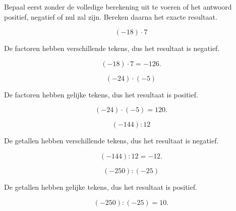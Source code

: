 \documentclass{ximera}
\begin{document}
\begin{oefening}{\oefU}

Bepaal eerst zonder de volledige berekening uit te voeren of het antwoord
positief, negatief of nul zal zijn. Bereken daarna het exacte resultaat.

\begin{question}

\[
(-18)\cdot7
\]

\begin{oplossing}

De factoren hebben verschillende tekens, dus het resultaat is negatief.

\[
(-18)\cdot7=-126.
\]

\end{oplossing}

\end{question}


\begin{question}

\[
(-24)\cdot(-5)
\]

\begin{oplossing}

De factoren hebben gelijke tekens, dus het resultaat is positief.

\[
(-24)\cdot(-5)=120.
\]

\end{oplossing}

\end{question}


\begin{question}

\[
(-144):12
\]

\begin{oplossing}

De getallen hebben verschillende tekens, dus het resultaat is negatief.

\[
(-144):12=-12.
\]

\end{oplossing}

\end{question}


\begin{question}

\[
(-250):(-25)
\]

\begin{oplossing}

De getallen hebben gelijke tekens, dus het resultaat is positief.

\[
(-250):(-25)=10.
\]


\end{oplossing}
\end{question}
\end{oefening}
\end{document}
